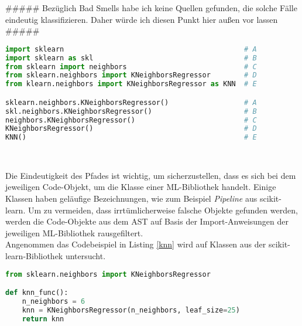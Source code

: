 \documentclass[german,bachelor]{swsLeipzig}
\begin{document}
\#\#\#\#\# Bezüglich Bad Smells habe ich keine Quellen gefunden, die solche Fälle eindeutig klassifizieren. Daher würde ich diesen Punkt hier außen vor lassen \#\#\#\#\#

\noindent\begin{minipage}{\linewidth}
\begin{lstlisting}[language=Python, frame=single, label=import,  basicstyle=\small, caption={Import- und Verwendungsmöglichkeiten der KNeighborsRegressor-Klasse aus scikit-learn},captionpos=b]
import sklearn                                           # A
import sklearn as skl                                    # B
from sklearn import neighbors                            # C
from sklearn.neighbors import KNeighborsRegressor        # D
from klearn.neighbors import KNeighborsRegressor as KNN  # E

sklearn.neighbors.KNeighborsRegressor()                  # A
skl.neighbors.KNeighborsRegressor()                      # B
neighbors.KNeighborsRegressor()                          # C
KNeighborsRegressor()                                    # D
KNN()                                                    # E
\end{lstlisting}
\end{minipage}
\

Die Eindeutigkeit des Pfades ist wichtig, um sicherzustellen, dass es sich bei dem jeweiligen Code-Objekt, um die Klasse
einer ML-Bibliothek handelt.
Einige Klassen haben geläufige Bezeichnungen, wie zum Beispiel \textit{Pipeline} aus scikit-learn.
Um zu vermeiden, dass irrtümlicherweise falsche Objekte gefunden werden, werden die Code-Objekte aus dem AST auf Basis der
Import-Anweisungen der jeweiligen ML-Bibliothek rausgefiltert.\\
\indent Angenommen das Codebeispiel in Listing \ref{knn} wird auf Klassen aus der scikit-learn-Bibliothek untersucht.\\

\noindent\begin{minipage}{\linewidth}
\begin{lstlisting}[language=Python, frame=single, label=knn,  basicstyle=\small, caption={Codebeispiel mit KNeighborsRegressor-Klasse},captionpos=b]
from sklearn.neighbors import KNeighborsRegressor

def knn_func():
    n_neighbors = 6
    knn = KNeighborsRegressor(n_neighbors, leaf_size=25)
    return knn
\end{lstlisting}
\end{minipage}
\
\end{document}

